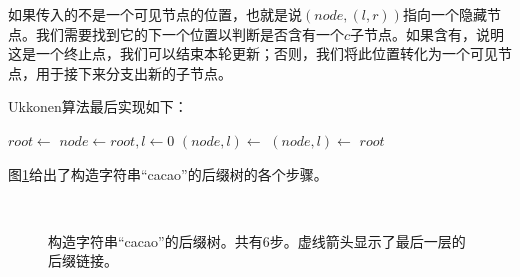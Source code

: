 \documentclass{ctexart}
\begin{document}
如果传入的不是一个可见节点的位置，也就是说$(node, (l, r))$指向一个隐藏节点。我们需要找到它的下一个位置以判断是否含有一个$c$子节点。如果含有，说明这是一个终止点，我们可以结束本轮更新；否则，我们将此位置转化为一个可见节点，用于接下来分支出新的子节点。

Ukkonen算法最后实现如下：

\begin{algorithmic}[1]
  \State $root \gets$ 
  \State $node \gets root, l \gets 0$
    \State $(node, l) \gets $ 
    \State $(node, l) \gets $ 
  \EndFor
  \State \Return $root$
\EndFunction
\end{algorithmic}

图\ref{fig:cons-stree-cacao}给出了构造字符串“cacao”的后缀树的各个步骤。

\begin{figure}[htbp]
  \centering
   \\
  \caption{构造字符串“cacao”的后缀树。共有6步。虚线箭头显示了最后一层的后缀链接。}
  \label{fig:cons-stree-cacao}
\end{figure}
\end{document}
